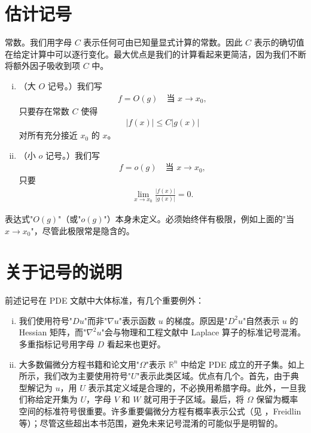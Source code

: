 \documentclass[../main.tex]{subfiles}
\begin{document}
\section{估计记号}\label{section:appA-估计记号}

\begin{definition}\label{definition:appA-常数}
常数。我们用字母 $C$ 表示任何可由已知量显式计算的常数。因此 $C$ 表示的确切值在给定计算中可以逐行变化。最大优点是我们的计算看起来更简洁，因为我们不断将额外因子吸收到项 $C$ 中。
\end{definition}

\begin{definition}\label{definition:appA-大O小O}
\begin{enumerate}[(i)]
\item （大 $O$ 记号。）我们写
\begin{align*}
f=O(g) \quad \text{当 } x\to x_0,
\end{align*}
只要存在常数 $C$ 使得
\begin{align*}
|f(x)|\leqslant C|g(x)|
\end{align*}
对所有充分接近 $x_0$ 的 $x$。

\item （小 $o$ 记号。）我们写
\begin{align*}
f=o(g) \quad \text{当 } x\to x_0,
\end{align*}
只要
\begin{align*}
\lim_{x\to x_0}\frac{|f(x)|}{|g(x)|}=0.
\end{align*}
\end{enumerate}
\end{definition}

\begin{remark}\label{remark:appA-极限说明}
表达式"$O(g)$"（或"$o(g)$"）本身未定义。必须始终伴有极限，例如上面的"当 $x\to x_0$"，尽管此极限常是隐含的。
\end{remark}

\section{关于记号的说明}\label{section:appA-记号说明}

前述记号在 PDE 文献中大体标准，有几个重要例外：

\begin{enumerate}[(i)]
\item 我们使用符号"$Du$"而非"$\nabla u$"表示函数 $u$ 的梯度。原因是"$D^2u$"自然表示 $u$ 的 Hessian 矩阵，而"$\nabla^2u$"会与物理和工程文献中 Laplace 算子的标准记号混淆。多重指标记号用字母 $D$ 看起来也更好。

\item 大多数偏微分方程书籍和论文用"$\Omega$"表示 $\mathbb{R}^n$ 中给定 PDE 成立的开子集。如上所示，我们改为主要使用符号"$U$"表示此类区域。优点有几个。首先，由于典型解记为 $u$，用 $U$ 表示其定义域是合理的，不必换用希腊字母。此外，一旦我们称给定开集为 $U$，字母 $V$ 和 $W$ 就可用于子区域。最后，将 $\Omega$ 保留为概率空间的标准符号很重要。许多重要偏微分方程有概率表示公式（见 \cite{E2}，Freidlin~\cite{Fd} 等）；尽管这些超出本书范围，避免未来记号混淆的可能似乎是明智的。
\end{enumerate}
\end{document}
